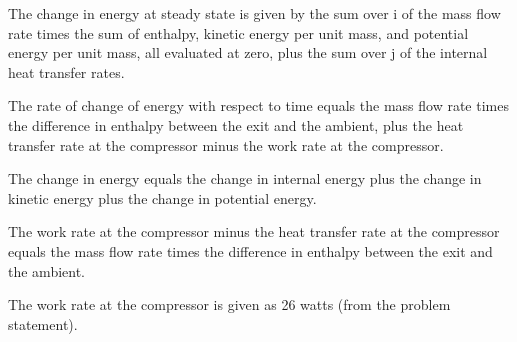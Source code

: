 The change in energy at steady state is given by the sum over i of the mass flow rate times the sum of enthalpy, kinetic energy per unit mass, and potential energy per unit mass, all evaluated at zero, plus the sum over j of the internal heat transfer rates.

The rate of change of energy with respect to time equals the mass flow rate times the difference in enthalpy between the exit and the ambient, plus the heat transfer rate at the compressor minus the work rate at the compressor.

The change in energy equals the change in internal energy plus the change in kinetic energy plus the change in potential energy.

The work rate at the compressor minus the heat transfer rate at the compressor equals the mass flow rate times the difference in enthalpy between the exit and the ambient.

The work rate at the compressor is given as 26 watts (from the problem statement).